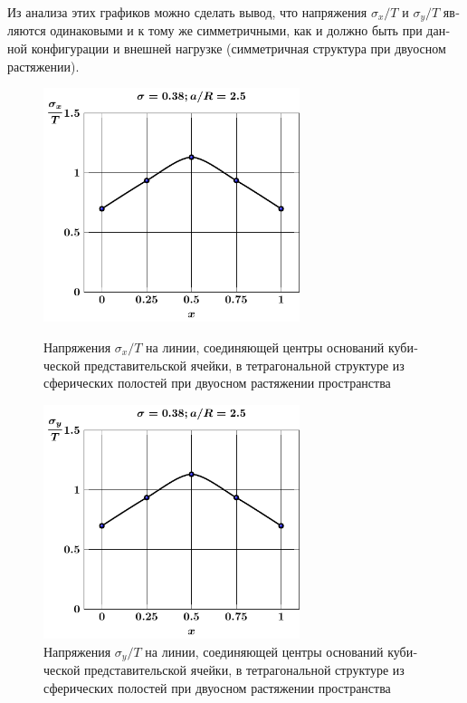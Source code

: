 \begin{russian}
Из анализа этих графиков можно сделать вывод, что напряжения $\sigma_x/T$ и $\sigma_y/T$ являются одинаковыми и к тому же симметричными, как и должно быть при данной конфигурации и внешней нагрузке (симметричная структура при двуосном растяжении). 


\begin{figure}[th!]
\centering\footnotesize
\parbox[b]{7.5cm}{\centering\includegraphics[width=7.5cm]{cav8-a25-c-c-sig_x-spheres-tension2.pdf}
\caption{Напряжения $\sigma_x/T$ на линии, соединяющей центры оснований кубической представительской ячейки, в тетрагональной структуре из сферических полостей при двуосном растяжении пространства
\label{f:8:15}}}\hfil\hfil
\parbox[b]{7.5cm}{\centering\includegraphics[width=7.5cm]{cav8-a25-c-c-sig_y-spheres-tension2.pdf}
\caption{Напряжения $\sigma_y/T$ на линии, соединяющей центры оснований кубической представительской ячейки, в тетрагональной структуре из сферических полостей при двуосном растяжении пространства
\label{f:8:16}}}
\end{figure}


\end{russian}
